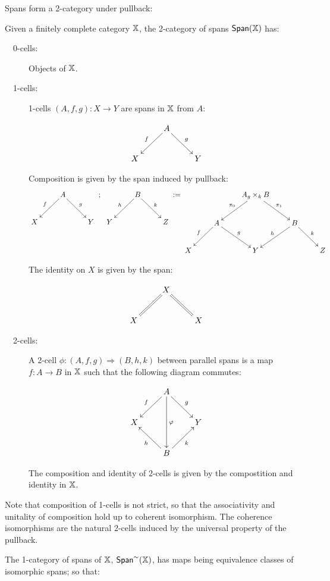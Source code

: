 Spans form a 2-category under pullback:
\begin{definition}
Given a finitely complete category $\mathbb{X}$, the 2-category of spans $\mathsf{Span}(\mathbb{X})$ has:

\begin{description}
\item[\ \ 0-cells:] Objects of $\mathbb{X}$.
\item[\ \ 1-cells:] 1-cells $(A,f,g):X\to Y$ are spans in $\mathbb{X}$ from $A$:

$$
\xymatrix{
    & A \ar[dl]_{f} \ar[dr]^{g}
    &
  \\X 
    &
    & Y
}
$$

Composition is given by the span induced by pullback:
$$
\xymatrix{
    & A\ar[dl]_{f} \ar[dr]^{g}
    &
  \\X 
    &
    & Y
}\ ;\
\xymatrix{
    & B\ar[dl]_{h} \ar[dr]^{k}
    &
  \\Y 
    &
    & Z
}
:=
\xymatrix{
    &
    & A {}_g\times_k B \ar[dl]_{\pi_0} \ar[dr]^{\pi_1}
    &
    &
  \\
    & A \ar[dl]_{f} \ar[dr]^{g}
    &
    & B \ar[dl]_{h} \ar[dr]^{k}
    &
  \\X
    &
    & Y
    &
    & Z
}
$$

The identity on $X$ is given by the span:

$$
\xymatrix{
    & X \ar@{=}[dl] \ar@{=}[dr] 
    &
  \\X 
    &
    & X
}
$$

\item[\ \ 2-cells:] A 2-cell $\phi:(A,f,g)\Rightarrow (B,h,k)$ between parallel spans is a map $f:A\to B$ in $\mathbb{X}$ such that the following diagram commutes:

$$
\xymatrix{
    & A \ar[dl]_{f} \ar[dr]^{g} \ar[dd]^{\phi}
    &
  \\X 
    &
    & Y
  \\
    & B \ar[ul]^{h} \ar[ur]_{k}
    &
}
$$

The composition and identity of  2-cells is given by the compostition and identity in $\mathbb{X}$.
\end{description}

Note that composition of 1-cells is not strict, so that the associativity and unitality of composition hold up to coherent isomorphism.  The coherence isomorphisms are the natural 2-cells induced by the universal property of the pullback.


The 1-category of spans of $\mathbb{X}$, $\mathsf{Span}^\sim(\mathbb{X})$, has maps being equivalence classes of isomorphic spans; so that:



\end{definition}

